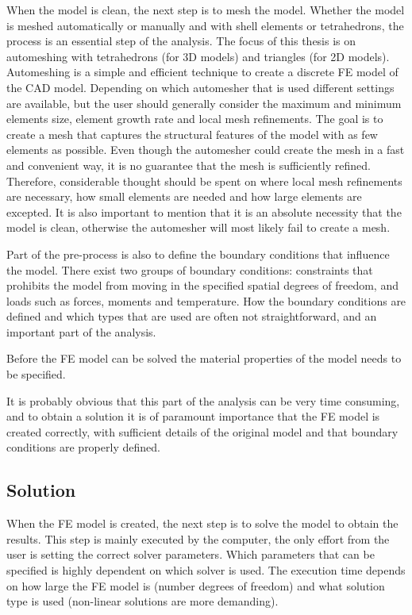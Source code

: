 When the model is clean, the next step is to mesh the model. Whether the model is meshed automatically or manually and with shell elements or tetrahedrons, the process is an essential step of the analysis. The focus of this thesis is on automeshing with tetrahedrons (for 3D models) and triangles (for 2D models). Automeshing is a simple and efficient technique to create a discrete FE model of the CAD model. Depending on which automesher that is used different settings are available, but the user should generally consider the maximum and minimum elements size, element growth rate and local mesh refinements. The goal is to create a mesh that captures the structural features of the model with as few elements as possible. Even though the automesher could create the mesh in a fast and convenient way, it is no guarantee that the mesh is sufficiently refined. Therefore, considerable thought should be spent on where local mesh refinements are necessary, how small elements are needed and how large elements are excepted. It is also important to mention that it is an absolute necessity that the model is clean, otherwise the automesher will most likely fail to create a mesh.~\cite[p.~251-255]{adams99}

Part of the pre-process is also to define the boundary conditions that influence the model. There exist two groups of boundary conditions: constraints that prohibits the model from moving in the specified spatial degrees of freedom, and loads such as forces, moments and temperature. How the boundary conditions are defined and which types that are used are often not straightforward, and an important part of the analysis.~\cite[p.~263]{adams99}

Before the FE model can be solved the material properties of the model needs to be specified.

It is probably obvious that this part of the analysis can be very time consuming, and to obtain a solution it is of paramount importance that the FE model is created correctly, with sufficient details of the original model and that boundary conditions are properly defined.

\subsection{Solution} %
\label{sub:solution}
When the FE model is created, the next step is to solve the model to obtain the results. This step is mainly executed by the computer, the only effort from the user is setting the correct solver parameters. Which parameters that can be specified is highly dependent on which solver is used. The execution time depends on how large the FE model is (number degrees of freedom) and what solution type is used (non-linear solutions are more demanding).

